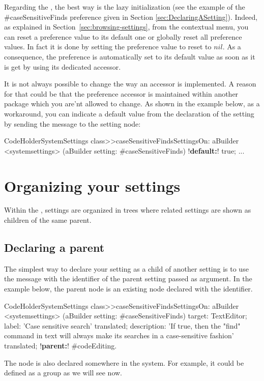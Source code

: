 \documentclass[a4paper,10pt,twoside]{book}
\begin{document}
Regarding the \setbrowser, the best way is the lazy initialization (see the example of the \#caseSensitiveFinds preference given in Section \ref{sec:DeclaringASetting}).
Indeed, as explained in Section~\ref{sec:browsing-settings}, from the \setbrowser contextual menu, you can reset a preference value to its default one or globally reset all preference values. In fact it is done by setting the preference value to reset to $nil$. As a consequence, the preference is automatically set to its default value as soon as it is get by using its dedicated accessor.

It is not always possible to change the way an accessor is implemented. A reason for that could be that the preference accessor is maintained within another package which you are'nt allowed to change. As shown in the example below, as a workaround, you can indicate a default value from the declaration of the setting by sending the message  to the setting node:
\begin{code}{}
CodeHolderSystemSettings class>>caseSensitiveFindsSettingsOn: aBuilder
	<systemsettings>
	(aBuilder setting: #caseSensitiveFinds)
		!\textbf{default:}! true;
    ...
\end{code}

\section{Organizing your settings}

Within the \setbrowser, settings are organized in trees where related settings are shown as children of the same parent. 

\subsection{Declaring a parent}
The simplest way to declare your setting as a child of another setting is to use the  message with the identifier of the parent setting passed as argument. In the example below, the parent node is an existing node declared with the  identifier. 

\begin{code}{}
CodeHolderSystemSettings class>>caseSensitiveFindsSettingsOn: aBuilder
	<systemsettings>
	(aBuilder setting: #caseSensitiveFinds) 
		target: TextEditor;
		label: 'Case sensitive search' translated;
		description: 'If true, then the "find" command in text will always make its searches in a case-sensitive fashion' translated;
		!\textbf{parent:}! #codeEditing.
\end{code}
The  node is also declared somewhere in the system. For example, it could be defined as a group as we will see now. 
\end{document}
